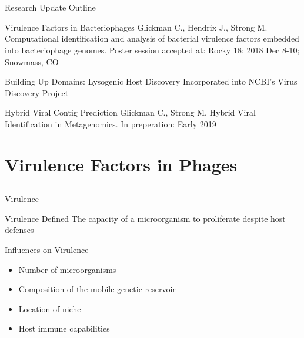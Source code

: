 \documentclass[11pt, xcolor=table]{beamer}
\begin{document}
	

\section{}
	\begin{frame}{Research Update Outline}
	\begin{block}{Virulence Factors in Bacteriophages}
	\tiny{Glickman C., Hendrix J., Strong M. Computational identification and analysis of bacterial virulence factors embedded into bacteriophage genomes. Poster session accepted at: Rocky 18: 2018 Dec 8-10; Snowmass, CO}
	\end{block}
	
	\begin{block}{\textcolor{black!50}{Building Up Domains: Lysogenic Host Discovery}}
  \textcolor{black!50}{Incorporated into NCBI's Virus Discovery Project}
	\end{block}

	\begin{block}{\textcolor{black!50}{Hybrid Viral Contig Prediction}}
	\textcolor{black!50}{\tiny{Glickman C., Strong M. Hybrid Viral Identification in Metagenomics. In preperation: Early 2019}}
	\end{block}
	\end{frame}
\section{Virulence Factors in Phages}
\subsection{}
	
	\begin{frame}{Virulence}
		\begin{block}{Virulence Defined}
		The capacity of a microorganism to proliferate despite host defenses
		\end{block}
		
		\begin{block}{Influences on Virulence}
		\begin{itemize}
		\item Number of microorganisms
		\item \alert{Composition of the mobile genetic reservoir}
		\item Location of niche
		\item Host immune capabilities
		\end{itemize}
		\end{block}
	
	\end{frame}
\end{document}
